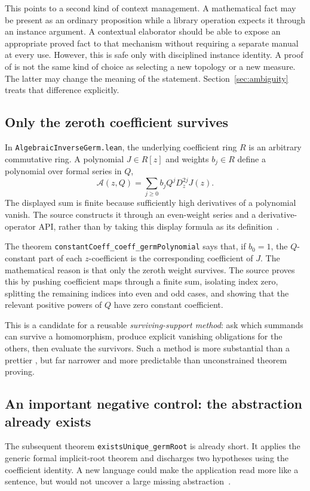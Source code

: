 \documentclass[11pt,letterpaper]{article}
\theoremstyle{definition}
\theoremstyle{remark}
\newcommand{\code}[1]{\texttt{\detokenize{#1}}}
\newcommand{\decl}[1]{{\small\urlstyle{tt}\nolinkurl{#1}}}
\begin{document}
This points to a second kind of context management. A mathematical fact may be present as an ordinary proposition while a library operation expects it through an instance argument. A contextual elaborator should be able to expose an appropriate proved fact to that mechanism without requiring a separate manual \code{letI} at every use. However, this is safe only with disciplined instance identity. A proof of \code{IsProbabilityMeasure mu} is not the same kind of choice as selecting a new topology or a new measure. The latter may change the meaning of the statement. Section~\ref{sec:ambiguity} treats that difference explicitly.

\subsection{Only the zeroth coefficient survives}
In \decl{AlgebraicInverseGerm.lean}, the underlying coefficient ring $R$ is an arbitrary commutative ring. A polynomial $J\in R[z]$ and weights $b_j\in R$ define a polynomial over formal series in $Q$,
\begin{equation}
 \mathcal A(z,Q)=\sum_{j\ge0} b_jQ^jD_z^{2j}J(z).
 \label{eq:germ}
\end{equation}
The displayed sum is finite because sufficiently high derivatives of a polynomial vanish. The source constructs it through an even-weight series and a derivative-operator API, rather than by taking this display formula as its definition~\cite{germ}.

The theorem \decl{constantCoeff_coeff_germPolynomial} says that, if $b_0=1$, the $Q$-constant part of each $z$-coefficient is the corresponding coefficient of $J$. The mathematical reason is that only the zeroth weight survives. The source proves this by pushing coefficient maps through a finite sum, isolating index zero, splitting the remaining indices into even and odd cases, and showing that the relevant positive powers of $Q$ have zero constant coefficient.

This is a candidate for a reusable \emph{surviving-support method}: ask which summands can survive a homomorphism, produce explicit vanishing obligations for the others, then evaluate the survivors. Such a method is more substantial than a prettier \code{simp}, but far narrower and more predictable than unconstrained theorem proving.

\subsection{An important negative control: the abstraction already exists}
The subsequent theorem \decl{existsUnique_germRoot} is already short. It applies the generic formal implicit-root theorem and discharges two hypotheses using the coefficient identity. A new language could make the application read more like a sentence, but would not uncover a large missing abstraction~\cite{germ}.
\end{document}
